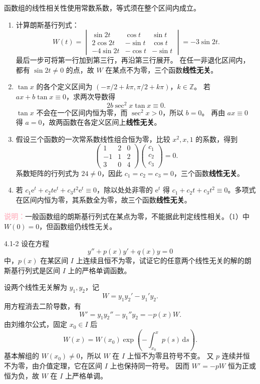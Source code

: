 \documentclass[UTF8,a4paper,11pt]{ctexart}
\newcommand{\dd}{\,\mathrm d}
\newcommand{\e}{\mathrm e}
\newcommand{\note}[1]{\par\smallskip\noindent\textcolor{pink}{\bfseries 说明：}#1\par\smallskip}
\begin{document}
\begin{solution}
函数组的线性相关性使用常数系数，等式须在整个区间内成立。
\begin{enumerate}[label=(\arabic*)]
\item 计算朗斯基行列式：
\[
W(t)=\begin{vmatrix}
\sin2t&\cos t&\sin t\\
2\cos2t&-\sin t&\cos t\\
-4\sin2t&-\cos t&-\sin t
\end{vmatrix}=-3\sin2t.
\]
最后一步可将第一行加到第三行，再沿第三行展开。
在任一非退化区间内，都有 $\sin2t\ne0$ 的点，故 $W$ 在某点不为零，三个函数\textbf{线性无关}。

\item $\tan x$ 的各个定义区间为
$(-\pi/2+k\pi,\pi/2+k\pi)$，$k\in\mathbb Z$。
若 $ax+b\tan x\equiv0$，求两次导数得
\[
2b\sec^2x\tan x\equiv0.
\]
$\tan x$ 不会在一个区间内恒为零，而 $\sec^2x>0$，所以 $b=0$。
再由 $ax\equiv0$ 得 $a=0$，故两函数在各定义区间上\textbf{线性无关}。

\item 假设三个函数的一次常系数线性组合恒为零，比较 $x^2,x,1$ 的系数，得到
\[
\begin{pmatrix}1&2&0\\-1&1&2\\3&0&4\end{pmatrix}
\begin{pmatrix}c_1\\c_2\\c_3\end{pmatrix}=0.
\]
系数矩阵的行列式为 $24\ne0$，因此 $c_1=c_2=c_3=0$，三个函数\textbf{线性无关}。

\item 若 $c_1\e^t+c_2t\e^t+c_3t^2\e^t\equiv0$，除以处处非零的 $\e^t$ 得
$c_1+c_2t+c_3t^2\equiv0$。多项式在区间内恒为零，其系数全为零，故三个函数\textbf{线性无关}。
\end{enumerate}
\note{一般函数组的朗斯基行列式在某点为零，不能据此判定线性相关。（1）中 $W(0)=0$，但函数组仍线性无关。}
\end{solution}

\begin{problem}{4.1-2}
设在方程
  \[
    y''+p(x)y'+q(x)y=0
  \]
  中，$p(x)$ 在某区间 $I$ 上连续且恒不为零，试证它的任意两个线性无关的解的朗斯基行列式是区间 $I$ 上的严格单调函数。
\end{problem}

\begin{solution}
设两个线性无关解为 $y_1,y_2$，记
\[
W=y_1y_2'-y_1'y_2.
\]
用方程消去二阶导数，有
\[
W'=y_1y_2''-y_1''y_2=-p(x)W.
\]
由刘维尔公式，固定 $x_0\in I$ 后
\[
W(x)=W(x_0)\exp\left(-\int_{x_0}^xp(s)\dd s\right).
\]
基本解组的 $W(x_0)\ne0$，所以 $W$ 在 $I$ 上恒不为零且符号不变。
又 $p$ 连续并恒不为零，由介值定理，它在区间 $I$ 上也保持同一符号。
因而 $W'=-pW$ 恒为正或恒为负，故 $\boxed{W\text{ 在 }I\text{ 上严格单调}}$。
\end{solution}
\end{document}
